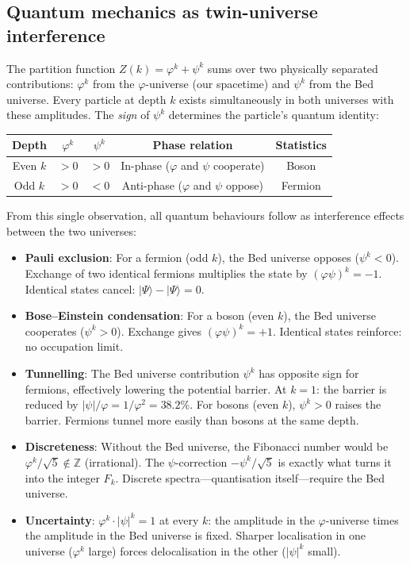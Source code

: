\documentclass[12pt,a4paper]{article}
\newcommand{\bed}{Bed universe}
\begin{document}
\subsection{Quantum mechanics as twin-universe interference}
\label{sec:qm-twin}

The partition function $Z(k) = \varphi^k + \psi^k$ sums over two physically separated contributions: $\varphi^k$ from the $\varphi$-universe (our spacetime) and $\psi^k$ from the \bed{}. Every particle at depth $k$ exists simultaneously in both universes with these amplitudes. The \emph{sign} of $\psi^k$ determines the particle's quantum identity:

\begin{center}
\begin{tabular}{|c|c|c|c|c|}
\hline
\textbf{Depth} & $\varphi^k$ & $\psi^k$ & \textbf{Phase relation} & \textbf{Statistics} \\
\hline
Even $k$ & $> 0$ & $> 0$ & In-phase ($\varphi$ and $\psi$ cooperate) & Boson \\
Odd $k$ & $> 0$ & $< 0$ & Anti-phase ($\varphi$ and $\psi$ oppose) & Fermion \\
\hline
\end{tabular}
\end{center}

\noindent From this single observation, all quantum behaviours follow as interference effects between the two universes:

\begin{itemize}
\item \textbf{Pauli exclusion}: For a fermion (odd $k$), the \bed{} opposes ($\psi^k < 0$). Exchange of two identical fermions multiplies the state by $(\varphi\psi)^k = -1$. Identical states cancel: $|\Psi\rangle - |\Psi\rangle = 0$.

\item \textbf{Bose--Einstein condensation}: For a boson (even $k$), the \bed{} cooperates ($\psi^k > 0$). Exchange gives $(\varphi\psi)^k = +1$. Identical states reinforce: no occupation limit.

\item \textbf{Tunnelling}: The \bed{} contribution $\psi^k$ has opposite sign for fermions, effectively lowering the potential barrier. At $k = 1$: the barrier is reduced by $|\psi|/\varphi = 1/\varphi^2 = 38.2\%$. For bosons (even $k$), $\psi^k > 0$ raises the barrier. Fermions tunnel more easily than bosons at the same depth.

\item \textbf{Discreteness}: Without the \bed{}, the Fibonacci number would be $\varphi^k / \sqrt{5} \notin \mathbb{Z}$ (irrational). The $\psi$-correction $-\psi^k/\sqrt{5}$ is exactly what turns it into the integer $F_k$. Discrete spectra---quantisation itself---require the \bed{}.

\item \textbf{Uncertainty}: $\varphi^k \cdot |\psi|^k = 1$ at every $k$: the amplitude in the $\varphi$-universe times the amplitude in the \bed{} is fixed. Sharper localisation in one universe ($\varphi^k$ large) forces delocalisation in the other ($|\psi|^k$ small).
\end{itemize}
\end{document}
